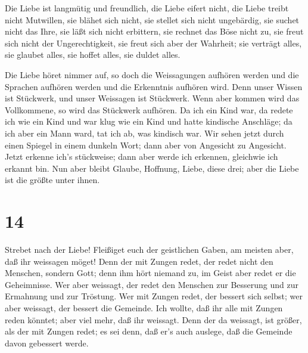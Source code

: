  Die Liebe ist langmütig und freundlich, die Liebe eifert
nicht, die Liebe treibt nicht Mutwillen, sie blähet sich nicht,
 sie stellet sich nicht ungebärdig, sie suchet nicht das
Ihre, sie läßt sich nicht erbittern, sie rechnet das Böse nicht zu,
 sie freut sich nicht der Ungerechtigkeit, sie freut sich
aber der Wahrheit;  sie verträgt alles, sie glaubet alles,
sie hoffet alles, sie duldet alles.

 Die Liebe höret nimmer auf, so doch die Weissagungen
aufhören werden und die Sprachen aufhören werden und die Erkenntnis
aufhören wird.  Denn unser Wissen ist Stückwerk, und unser
Weissagen ist Stückwerk.  Wenn aber kommen wird das
Vollkommene, so wird das Stückwerk aufhören.  Da ich ein
Kind war, da redete ich wie ein Kind und war klug wie ein Kind und hatte
kindische Anschläge; da ich aber ein Mann ward, tat ich ab, was kindisch
war.  Wir sehen jetzt durch einen Spiegel in einem dunkeln
Wort; dann aber von Angesicht zu Angesicht. Jetzt erkenne ich's
stückweise; dann aber werde ich erkennen, gleichwie ich erkannt bin.
 Nun aber bleibt Glaube, Hoffnung, Liebe, diese drei; aber
die Liebe ist die größte unter ihnen.

\hypertarget{section-13}{%
\section{14}\label{section-13}}

 Strebet nach der Liebe! Fleißiget euch der geistlichen
Gaben, am meisten aber, daß ihr weissagen möget!  Denn der
mit Zungen redet, der redet nicht den Menschen, sondern Gott; denn ihm
hört niemand zu, im Geist aber redet er die Geheimnisse. 
Wer aber weissagt, der redet den Menschen zur Besserung und zur
Ermahnung und zur Tröstung.  Wer mit Zungen redet, der
bessert sich selbst; wer aber weissagt, der bessert die Gemeinde.
 Ich wollte, daß ihr alle mit Zungen reden könntet; aber
viel mehr, daß ihr weissagt. Denn der da weissagt, ist größer, als der
mit Zungen redet; es sei denn, daß er's auch auslege, daß die Gemeinde
davon gebessert werde.

